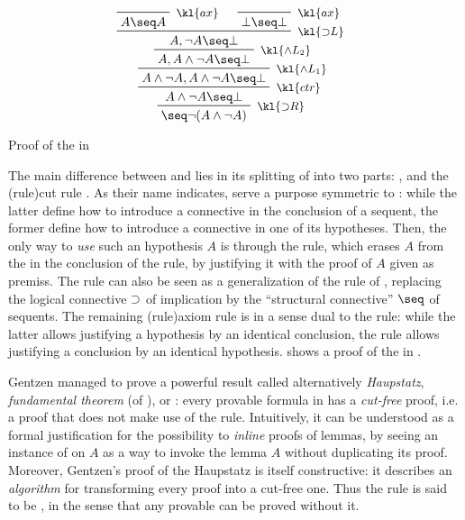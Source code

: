 \begin{marginfigure}
  $$
  \R[\kl{{\limp}R}]
  {\R[\kl{ctr}]
  {\R[\kl{\land L_1}]
  {\R[\kl{\land L_2}]
  {\R[\kl{{\limp}L}]
    {\R[\kl{ax}]
    {A \seq A}}
    {\R[\kl{ax}]
    {\bot \seq \bot}}
    {A, \neg A \seq \bot}}
  {A, A \land \neg A \seq \bot}}
  {A \land \neg A, A \land \neg A \seq \bot}}
  {A \land \neg A \seq \bot}}
  {\seq \neg (A \land \neg A)}
  $$
  \caption{Proof of the  in }
\end{marginfigure}

\AP
The main difference between  and 
lies in its splitting of  into two parts: , and the \intro(rule){cut} rule . As their name
indicates,  serve a purpose symmetric to : while the latter define how to introduce a connective in
the conclusion of a sequent, the former define how to introduce a connective in
one of its hypotheses. Then, the only way to \emph{use} such an hypothesis $A$
is through the  rule, which erases $A$ from the  in the
conclusion of the rule, by justifying it with the proof of $A$ given as premiss.
The  rule can also be seen as a generalization of the 
rule of , replacing the logical connective $\supset$ of
implication by the ``structural connective'' $\seq$ of sequents. The remaining
\intro(rule){axiom} rule  is in a sense dual to the  rule:
while the latter allows justifying a hypothesis by an identical conclusion, the
 rule allows justifying a conclusion by an identical
hypothesis.  shows
a proof of the  in .

Gentzen managed to prove a powerful result called alternatively
\textit{Haupstatz}, \emph{fundamental theorem} (of ), or
: every provable formula in  has a
\emph{cut-free} proof, i.e. a proof that does not make use of the  rule.
Intuitively, it can be understood as a formal justification for the possibility
to \emph{inline} proofs of lemmas, by seeing an instance of  on $A$ as a
way to invoke the lemma $A$ without duplicating its proof. Moreover, Gentzen's
proof of the Haupstatz is itself constructive: it describes an \emph{algorithm}
for transforming every  proof into a cut-free one. Thus the
 rule is said to be , in the sense that any provable
 can be proved without it.

